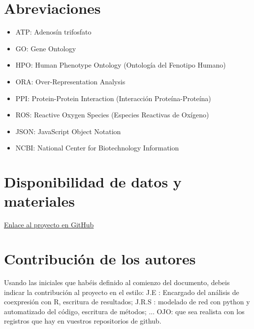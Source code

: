 \documentclass{bmcart}
\begin{document}
	\begin{backmatter}
	
		\section*{Abreviaciones}%
			\begin{itemize}
				\item ATP: Adenosín trifosfato
				\item GO: Gene Ontology
				\item HPO: Human Phenotype Ontology (Ontología del Fenotipo Humano)
				\item ORA: Over-Representation Analysis
				\item PPI: Protein-Protein Interaction (Interacción Proteína-Proteína)
				\item ROS: Reactive Oxygen Species (Especies Reactivas de Oxígeno)
				\item JSON: JavaScript Object Notation
				\item NCBI: National Center for Biotechnology Information
			\end{itemize}
		
		\section*{Disponibilidad de datos y materiales}%
			\href{https://github.com/juliadelrio0/project_template}{Enlace al proyecto en GitHub}
			
		
		\section*{Contribución de los autores}
			Usando las iniciales que habéis definido al comienzo del documento, debeis indicar la contribución al proyecto en el estilo:
			J.E : Encargado del análisis de coexpresión con R, escritura de resultados; J.R.S : modelado de red con python y automatizado del código, escritura de métodos; ...
			OJO: que sea realista con los registros que hay en vuestros repositorios de github. 
		
		
		
	
	\end{backmatter}
\end{document}
